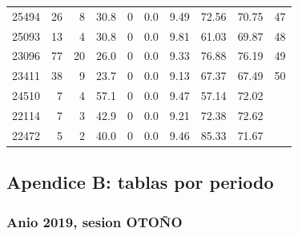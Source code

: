 \begin{longtable}{lrrrrrrrrr}
25494 & 26 & 8 & 30.8 & 0 & 0.0 & 9.49 & 72.56 & 70.75 & 47 \\
25093 & 13 & 4 & 30.8 & 0 & 0.0 & 9.81 & 61.03 & 69.87 & 48 \\
23096 & 77 & 20 & 26.0 & 0 & 0.0 & 9.33 & 76.88 & 76.19 & 49 \\
23411 & 38 & 9 & 23.7 & 0 & 0.0 & 9.13 & 67.37 & 67.49 & 50 \\
24510 & 7 & 4 & 57.1 & 0 & 0.0 & 9.47 & 57.14 & 72.02 &  \\
22114 & 7 & 3 & 42.9 & 0 & 0.0 & 9.21 & 72.38 & 72.62 &  \\
22472 & 5 & 2 & 40.0 & 0 & 0.0 & 9.46 & 85.33 & 71.67 &  \\
\bottomrule
\end{longtable}
\endgroup

\clearpage

\subsection{Apendice B: tablas por periodo}

\subsubsection{Anio 2019, sesion OTOÑO}

